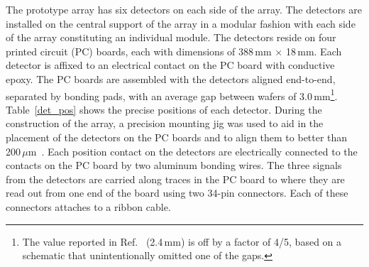 The prototype array has six detectors on each side of the array.  The detectors are installed on the central support of the array in a modular fashion with each side of the array constituting an individual module.  The detectors reside on four printed circuit (PC) boards, each with dimensions of 388\,mm $\times$ 18\,mm.  Each detector is affixed to an electrical contact on the PC board with conductive epoxy.  The PC boards are assembled with the detectors aligned end-to-end, separated by bonding pads, with \label{typo4}%
an average gap between wafers of 3.0\,mm\footnote{The value reported in Ref.~\cite{Lighthall_2010} (2.4\,mm) is off by a factor of 4/5, based on a schematic that unintentionally omitted one of the gaps.}.  Table~\ref{det_pos} shows the precise positions of each detector.  During the construction of the array, a precision mounting jig was used to aid in the placement of the detectors on the PC boards and to align them to better than 200\,$\mu$m~\cite{Marley_2008}.  Each position contact on the detectors are electrically connected to the contacts on the PC board by two aluminum bonding wires.  The three signals from the detectors are carried along traces in the PC board to where they are read out from one end of the board using two 34-pin connectors.  Each of these connectors attaches to a ribbon cable.

